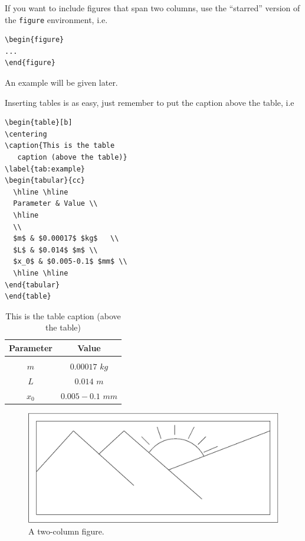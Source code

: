 \documentclass{fonetik}
\begin{document}
If you want to include figures that span two columns, use the
``starred'' version of the {\tt figure} environment, i.e.
\begin{verbatim}
\begin{figure}
...
\end{figure}
\end{verbatim}
An example will be given later.

Inserting tables is as easy, just remember to put the caption above the
table, i.e
\begin{verbatim}
\begin{table}[b]
\centering
\caption{This is the table
   caption (above the table)}
\label{tab:example}
\begin{tabular}{cc}
  \hline \hline
  Parameter & Value \\
  \hline
  \\
  $m$ & $0.00017$ $kg$   \\
  $L$ & $0.014$ $m$ \\
  $x_0$ & $0.005-0.1$ $mm$ \\
  \hline \hline
\end{tabular}
\end{table}
\end{verbatim}

\begin{table}[b]
\centering
\caption{This is the table caption
  (above the table)}
\label{tab:example}
\begin{tabular}{cc}
  \hline \hline
     Parameter & Value \\
     \hline
     \\
      $m$ & $0.00017$ $kg$   \\
      $L$ & $0.014$ $m$ \\
      $x_0$ & $0.005-0.1$ $mm$ \\
      \hline \hline
\end{tabular}
\end{table}

\begin{figure}[!t]
\centering
\includegraphics[width=\textwidth]{figures/figa.eps}
\caption{A two-column figure.} \label{fig:concrete}
\end{figure}
\end{document}
